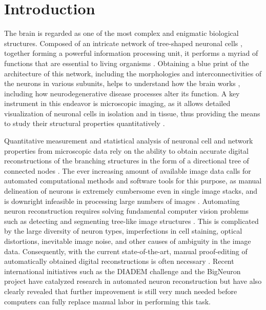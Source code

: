 \section{Introduction}
\label{ch4:sec:intro}
The brain is regarded as one of the most complex and enigmatic biological structures. Composed of an intricate network of tree-shaped neuronal cells \cite{ascoli2015trees}, together forming a powerful information processing unit, it performs a myriad of functions that are essential to living organisms \cite{kandel2000principles}. Obtaining a blue print of the architecture of this network, including the morphologies and interconnectivities of the neurons in various subunits, helps to understand how the brain works \cite{ascoli2002computational, donohue2008comparative, cuntz2010one}, including how  neurodegenerative disease processes alter its function. A key instrument in this endeavor is microscopic imaging, as it allows detailed visualization of neuronal cells in isolation and in tissue, thus providing the means to study their structural properties quantitatively \cite{senft2011brief}.

Quantitative measurement and statistical analysis of neuronal cell and network properties from microscopic data rely on the ability to obtain accurate digital reconstructions of the branching structures \cite{halavi2012digital} in the form of a directional tree of connected nodes \cite{ascoli2007neuromorpho}. The ever increasing amount of available image data calls for automated computational methods and software tools for this purpose, as manual delineation of neurons is extremely cumbersome even in single image stacks, and is downright infeasible in processing large numbers of images \cite{svoboda2011past, senft2011brief}. Automating neuron reconstruction requires solving fundamental computer vision problems such as detecting and segmenting tree-like image structures \cite{meijering2010neuron, donohue2011automated, acciai2016automated}. This is complicated by the large diversity of neuron types, imperfections in cell staining, optical distortions, inevitable image noise, and other causes of ambiguity in the image data. Consequently, with the current state-of-the-art, manual proof-editing of automatically obtained digital reconstructions is often necessary \cite{peng2011proof}. Recent international initiatives such as the DIADEM challenge \cite{gillette2011diademchallenge} and the BigNeuron project \cite{peng2015bigneuron, peng2015diadem} have catalyzed research in automated neuron reconstruction but have also clearly revealed that further improvement is still very much needed before computers can fully replace manual labor in performing this task.

